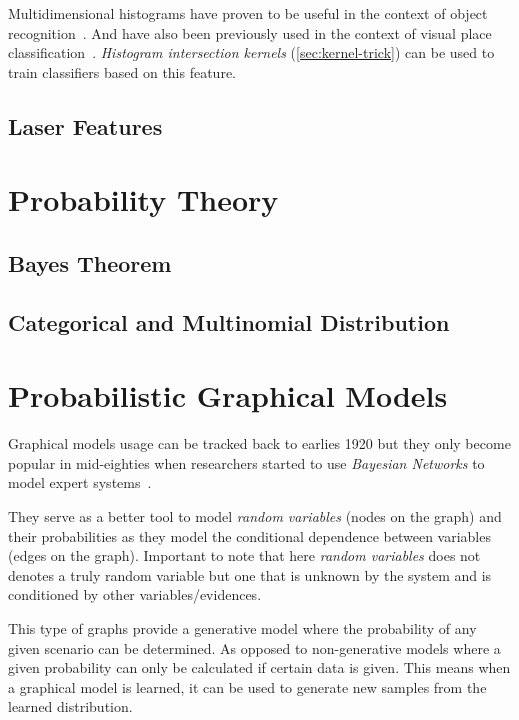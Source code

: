Multidimensional histograms have proven to be useful in the context of object
recognition~\citep{schiele1996object}. And have also been previously used in
the context of visual place classification~\cite{pronobis2010ijrr}.
\emph{Histogram intersection kernels} (\autoref{sec:kernel-trick}) can be used
to train classifiers based on this feature.

\subsection{Laser Features}


\clearpage
\section{Probability Theory}
\subsection{Bayes Theorem}

\subsection{Categorical and Multinomial Distribution}

\section{Probabilistic Graphical Models}
\label{sec:graphical-models}
Graphical models usage can be tracked back to earlies 1920 but they only become
popular in mid-eighties when researchers started to use \emph{Bayesian Networks}
to model expert systems~\citep{borgelt2002graphical}.

They serve as a better tool to model \emph{random variables}
(nodes on the graph) and their probabilities as they model the conditional
dependence between variables (edges on the graph). Important to note that here
\emph{random variables} does not denotes a truly random variable but one that is
unknown by the system and is conditioned by other variables/evidences.

This type of graphs provide a generative model where the probability of any
given scenario can be determined. As opposed to non-generative models where a
given probability can only be calculated if certain data is given.
This means when a graphical model is learned, it can be used to generate new
samples from the learned distribution.

